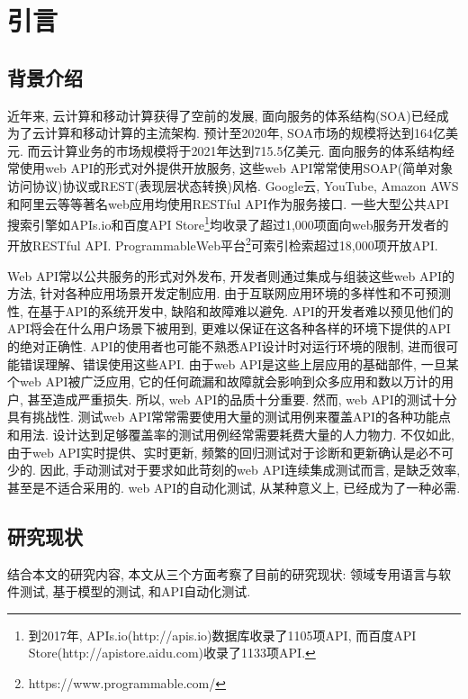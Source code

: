 \chapter{引言}

	\section{背景介绍}
    
        近年来, 云计算和移动计算获得了空前的发展, 面向服务的体系结构(SOA)已经成为了云计算和移动计算的主流架构\cite{wintergreen17}. 预计至2020年, SOA市场的规模将达到164亿美元. 而云计算业务的市场规模将于2021年达到715.5亿美元\cite{skyhighnetworks18azure}. 面向服务的体系结构经常使用web API的形式对外提供开放服务\cite{hamza15}, 这些web API常常使用SOAP(简单对象访问协议)协议或REST(表现层状态转换)风格\cite{fielding2000architectural}. Google云\cite{googlecloud17}, YouTube\cite{youtube17}, Amazon AWS\cite{amazonec217}和阿里云\cite{alibaba17}等等著名web应用均使用RESTful API作为服务接口. 一些大型公共API搜索引擎如APIs.io和百度API Store\footnote{到2017年, APIs.io(http://apis.io)数据库收录了1105项API, 而百度API Store(http://apistore.aidu.com)收录了1133项API.}均收录了超过1,000项面向web服务开发者的开放RESTful API. ProgrammableWeb平台\footnote{https://www.programmable.com/}可索引检索超过18,000项开放API.
        
        Web API常以公共服务的形式对外发布, 开发者则通过集成与组装这些web API的方法, 针对各种应用场景开发定制应用. 由于互联网应用环境的多样性和不可预测性, 在基于API的系统开发中, 缺陷和故障难以避免. API的开发者难以预见他们的API将会在什么用户场景下被用到, 更难以保证在这各种各样的环境下提供的API的绝对正确性. API的使用者也可能不熟悉API设计时对运行环境的限制, 进而很可能错误理解、错误使用这些API. 由于web API是这些上层应用的基础部件, 一旦某个web API被广泛应用, 它的任何疏漏和故障就会影响到众多应用和数以万计的用户, 甚至造成严重损失. 所以, web API的品质十分重要. 然而, web API的测试十分具有挑战性. 测试web API常常需要使用大量的测试用例来覆盖API的各种功能点和用法. 设计达到足够覆盖率的测试用例经常需要耗费大量的人力物力. 不仅如此, 由于web API实时提供、实时更新, 频繁的回归测试对于诊断和更新确认是必不可少的. 因此, 手动测试对于要求如此苛刻的web API连续集成测试而言, 是缺乏效率, 甚至是不适合采用的. web API的自动化测试, 从某种意义上, 已经成为了一种必需.

	\section{研究现状}
	
    	结合本文的研究内容, 本文从三个方面考察了目前的研究现状: 领域专用语言与软件测试, 基于模型的测试, 和API自动化测试.
    	
